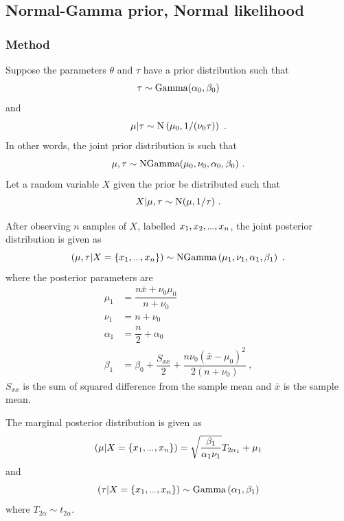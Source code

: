 \documentclass[a4paper,10pt]{article}
\newcommand{\dotdotdot}{\vphantom{.}_{\cdots}}
\begin{document}
\subsection{Normal-Gamma prior, Normal likelihood}

\subsubsection{Method}
Suppose the parameters $\theta$ and $\tau$ have a prior distribution such that
\begin{equation}
\tau\sim\textup{Gamma}(\alpha_0,\beta_0)
\end{equation}
and
\begin{equation}
\mu|\tau\sim\textup{N}\left(\mu_0,1/(\nu_0\tau)\right) \ .
\end{equation}
In other words, the joint prior distribution is such that
\begin{equation}
\mu,\tau\sim\textup{NGamma}(\mu_0,\nu_0,\alpha_0,\beta_0) \ .
\end{equation}
Let a random variable $X$ given the prior be distributed such that
\begin{equation}
X|\mu,\tau\sim\textup{N}(\mu,1/\tau) \ .
\end{equation}

After observing $n$ samples of $X$, labelled $x_1,x_2,\dotdotdot ,x_n$, the joint posterior distribution is given as
\begin{equation}
(\mu,\tau|X=\{x_1,\dotdotdot ,x_n\})\sim\textup{NGamma}
\left(
	\mu_1,
	\nu_1,
	\alpha_1,
	\beta_1
\right) \ .
\end{equation}
where the posterior parameters are
\begin{align}
\mu_1 &= \dfrac{n\bar{x}+\nu_0\mu_0}{n+\nu_0} \\
\nu_1 &= n+\nu_0 \\
\alpha_1 &= \dfrac{n}{2}+\alpha_0 \\
\beta_1 &= \beta_0+\dfrac{S_{xx}}{2}+\dfrac{n\nu_0(\bar{x}-\mu_0)^2}{2(n+\nu_0)} \ ,
\end{align}
$S_{xx}$ is the sum of squared difference from the sample mean and $\bar{x}$ is the sample mean.

The marginal posterior distribution is given as
\begin{equation}
(\mu|X=\{x_1,\dotdotdot ,x_n\}) = \sqrt{\dfrac{\beta_1}{\alpha_1\nu_1}} T_{2\alpha_1}
+ \mu_1
\end{equation}
and
\begin{equation}
(\tau|X=\{x_1,\dotdotdot ,x_n\}) \sim \textup{Gamma}\left(
\alpha_1,\beta_1
\right)
\end{equation}
where $T_{2\alpha}\sim t_{2\alpha}$.
\end{document}
